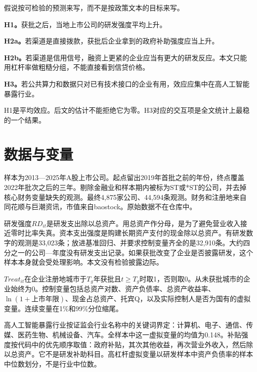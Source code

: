 \documentclass[12pt,hyperref,a4paper,UTF8]{ctexart}
\begin{document}
假说按可检验的预测来写，而不是按政策文本的目标来写。

\textbf{H1。}获批之后，当地上市公司的研发强度平均上升。

\textbf{H2a。}若渠道是直接拨款，获批后企业拿到的政府补助强度应当上升。

\textbf{H2b。}若渠道是信用信号，融资上更紧的企业应当有更大的研发反应。本文只能用杠杆率做粗糙分组，不能直接看到信贷价格。

\textbf{H3。}若公共算力和数据只对已有技术接口的企业有用，效应应集中在高人工智能暴露行业\parencite{cohen1990absorptive}。

H1是平均效应。后文的估计不能拒绝它为零。H3对应的交互项是全文统计上最稳的一个结果。

\section{数据与变量}

样本为2013—2025年A股上市公司。起点留出2019年首批之前的年份，终点覆盖2022年批次之后的三年。剔除金融业和样本期内被标为ST或*ST的公司，并去掉核心财务变量缺失的观测。最终4,875家公司、44,594条观测。财务和注册地来自同花顺与巨潮资讯，市值来自baostock。原始数据不在仓库中。

研发强度$RD_{it}$是研发支出除以总资产。用总资产作分母，是为了避免营业收入接近零时比率失真。资本支出强度是购建长期资产支付的现金除以总资产。有研发数字的观测是33,023条；放进基准回归、并要求控制变量齐全的是32,910条。大约四分之一的公司—年度没有研发支出记录。如果获批改变了企业是否披露研发，这个样本本身就会受处理影响。本文没有检验披露边际。

$Treat_{it}$在企业注册地城市于$T_g$年获批且$t\ge T_g$时取1，否则取0。从未获批城市的企业始终为0。控制变量包括总资产对数、资产负债率、总资产收益率、$\ln(1+\text{上市年限})$、现金占总资产、托宾Q，以及实际控制人是否为国有的虚拟变量。连续变量在1\%和99\%分位缩尾。

高人工智能暴露行业按证监会行业名称中的关键词界定：计算机、电子、通信、传媒、医药生物、机械设备、汽车。全样本中这一虚拟变量的均值为0.148。补贴强度按代码中的优先顺序取值：政府补贴，其次其他收益，再次营业外收入，然后除以总资产。它不是研发补助科目。高杠杆虚拟变量以研发样本中资产负债率的样本中位数划分，不是行业中位数。
\end{document}
